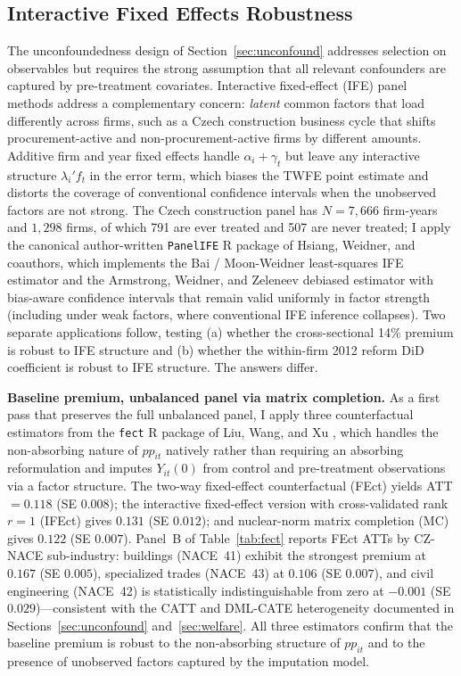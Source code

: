 \documentclass[11pt]{article}
\begin{document}
\subsection{Interactive Fixed Effects Robustness}\label{sec:panel}

The unconfoundedness design of Section~\ref{sec:unconfound} addresses selection on observables but requires the strong assumption that all relevant confounders are captured by pre-treatment covariates. Interactive fixed-effect (IFE) panel methods address a complementary concern: \emph{latent} common factors that load differently across firms, such as a Czech construction business cycle that shifts procurement-active and non-procurement-active firms by different amounts. Additive firm and year fixed effects handle $\alpha_i + \gamma_t$ but leave any interactive structure $\lambda_i' f_t$ in the error term, which biases the TWFE point estimate and distorts the coverage of conventional confidence intervals when the unobserved factors are not strong. The Czech construction panel has $N = 7{,}666$ firm-years and $1{,}298$ firms, of which 791 are ever treated and 507 are never treated; I apply the canonical author-written \texttt{PanelIFE} R package of Hsiang, Weidner, and coauthors, which implements the Bai \cite{Bai2009} / Moon-Weidner \cite{MoonWeidner2015} least-squares IFE estimator and the Armstrong, Weidner, and Zeleneev \cite{ArmstrongWeidnerZeleneev2024} debiased estimator with bias-aware confidence intervals that remain valid uniformly in factor strength (including under weak factors, where conventional IFE inference collapses). Two separate applications follow, testing (a) whether the cross-sectional 14\% premium is robust to IFE structure and (b) whether the within-firm 2012 reform DiD coefficient is robust to IFE structure. The answers differ.

\textbf{Baseline premium, unbalanced panel via matrix completion.} As a first pass that preserves the full unbalanced panel, I apply three counterfactual estimators from the \texttt{fect} R package of Liu, Wang, and Xu \cite{LiuWangXu2022}, which handles the non-absorbing nature of $pp_{it}$ natively rather than requiring an absorbing reformulation and imputes $Y_{it}(0)$ from control and pre-treatment observations via a factor structure. The two-way fixed-effect counterfactual (FEct) yields ATT $= 0.118$ (SE $0.008$); the interactive fixed-effect version with cross-validated rank $r = 1$ (IFEct) gives $0.131$ (SE $0.012$); and nuclear-norm matrix completion (MC) gives $0.122$ (SE $0.007$). Panel~B of Table~\ref{tab:fect} reports FEct ATTs by CZ-NACE sub-industry: buildings (NACE~41) exhibit the strongest premium at $0.167$ (SE $0.005$), specialized trades (NACE~43) at $0.106$ (SE $0.007$), and civil engineering (NACE~42) is statistically indistinguishable from zero at $-0.001$ (SE $0.029$)---consistent with the CATT and DML-CATE heterogeneity documented in Sections~\ref{sec:unconfound} and~\ref{sec:welfare}. All three estimators confirm that the baseline premium is robust to the non-absorbing structure of $pp_{it}$ and to the presence of unobserved factors captured by the imputation model.
\end{document}
